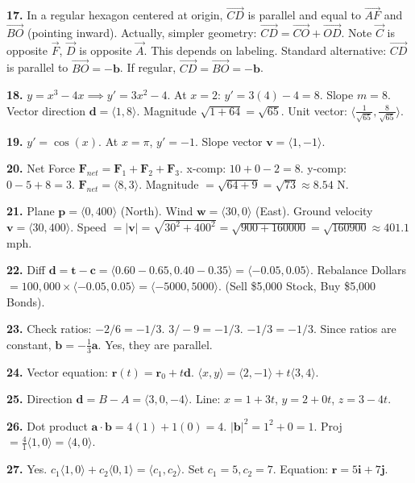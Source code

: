 \documentclass[12pt]{article}
\begin{document}
\textbf{17.} In a regular hexagon centered at origin, $\vec{CD}$ is parallel and equal to $\vec{AF}$ and $\vec{BO}$ (pointing inward).
Actually, simpler geometry: $\vec{CD} = \vec{CO} + \vec{OD}$.
Note $\vec{C}$ is opposite $\vec{F}$, $\vec{D}$ is opposite $\vec{A}$. This depends on labeling.
Standard alternative: $\vec{CD}$ is parallel to $\vec{BO} = -\mathbf{b}$.
If regular, $\vec{CD} = \vec{BO} = -\mathbf{b}$.

\textbf{18.} $y = x^3 - 4x \implies y' = 3x^2 - 4$.
At $x=2$: $y' = 3(4) - 4 = 8$. Slope $m=8$.
Vector direction $\mathbf{d} = \langle 1, 8 \rangle$. Magnitude $\sqrt{1+64} = \sqrt{65}$.
Unit vector: $\langle \frac{1}{\sqrt{65}}, \frac{8}{\sqrt{65}} \rangle$.

\textbf{19.} $y' = \cos(x)$. At $x=\pi$, $y' = -1$.
Slope vector $\mathbf{v} = \langle 1, -1 \rangle$.

\textbf{20.} Net Force $\mathbf{F}_{net} = \mathbf{F}_1 + \mathbf{F}_2 + \mathbf{F}_3$.
x-comp: $10 + 0 - 2 = 8$.
y-comp: $0 - 5 + 8 = 3$.
$\mathbf{F}_{net} = \langle 8, 3 \rangle$. Magnitude $= \sqrt{64+9} = \sqrt{73} \approx 8.54$ N.

\textbf{21.} Plane $\mathbf{p} = \langle 0, 400 \rangle$ (North). Wind $\mathbf{w} = \langle 30, 0 \rangle$ (East).
Ground velocity $\mathbf{v} = \langle 30, 400 \rangle$.
Speed $= |\mathbf{v}| = \sqrt{30^2 + 400^2} = \sqrt{900 + 160000} = \sqrt{160900} \approx 401.1$ mph.

\textbf{22.} Diff $\mathbf{d} = \mathbf{t} - \mathbf{c} = \langle 0.60 - 0.65, 0.40 - 0.35 \rangle = \langle -0.05, 0.05 \rangle$.
Rebalance Dollars $= 100,000 \times \langle -0.05, 0.05 \rangle = \langle -5000, 5000 \rangle$.
(Sell \$5,000 Stock, Buy \$5,000 Bonds).

\textbf{23.} Check ratios: $-2/6 = -1/3$. $3/-9 = -1/3$. $-1/3 = -1/3$.
Since ratios are constant, $\mathbf{b} = -\frac{1}{3}\mathbf{a}$. Yes, they are parallel.

\textbf{24.} Vector equation: $\mathbf{r}(t) = \mathbf{r}_0 + t\mathbf{d}$.
$\langle x, y \rangle = \langle 2, -1 \rangle + t\langle 3, 4 \rangle$.

\textbf{25.} Direction $\mathbf{d} = B - A = \langle 3, 0, -4 \rangle$.
Line: $x = 1 + 3t$, $y = 2 + 0t$, $z = 3 - 4t$.

\textbf{26.} Dot product $\mathbf{a} \cdot \mathbf{b} = 4(1) + 1(0) = 4$.
$|\mathbf{b}|^2 = 1^2 + 0 = 1$.
Proj $= \frac{4}{1} \langle 1, 0 \rangle = \langle 4, 0 \rangle$.

\textbf{27.} Yes. $c_1\langle 1,0 \rangle + c_2\langle 0,1 \rangle = \langle c_1, c_2 \rangle$.
Set $c_1=5, c_2=7$. Equation: $\mathbf{r} = 5\mathbf{i} + 7\mathbf{j}$.
\end{document}
